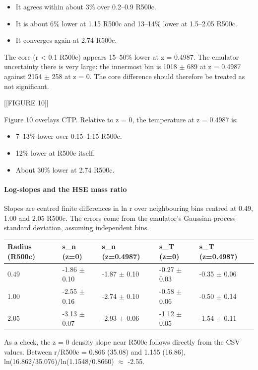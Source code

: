 \documentclass[11pt,a4paper]{article}
\begin{document}
\begin{itemize}
  \item It agrees within about 3\% over 0.2--0.9 R500c.
  \item It is about 6\% lower at 1.15 R500c and 13--14\% lower at 1.5--2.05 R500c.
  \item It converges again at 2.74 R500c.
\end{itemize}
The core (r \textless{} 0.1 R500c) appears 15--50\% lower at z = 0.4987. The emulator uncertainty there is very large: the innermost bin is 1018 $\pm$ 689 at z = 0.4987 against 2154 $\pm$ 258 at z = 0. The core difference should therefore be treated as not significant.

[[FIGURE 10]]

Figure 10 overlays CTP. Relative to z = 0, the temperature at z = 0.4987 is:

\begin{itemize}
  \item 7--13\% lower over 0.15--1.15 R500c.
  \item 12\% lower at R500c itself.
  \item About 30\% lower at 2.74 R500c.
\end{itemize}
\paragraph{Log-slopes and the HSE mass ratio}
Slopes are centred finite differences in ln r over neighbouring bins centred at 0.49, 1.00 and 2.05 R500c. The errors come from the emulator's Gaussian-process standard deviation, assuming independent bins.

\begin{longtable}{@{}p{}p{}p{}p{}p{}@{}}
\toprule
\textbf{Radius (R500c)} & \textbf{s\_n (z=0)} & \textbf{s\_n (z=0.4987)} & \textbf{s\_T (z=0)} & \textbf{s\_T (z=0.4987)} \\ \midrule \endhead
0.49 & -1.86 $\pm$ 0.10 & -1.87 $\pm$ 0.10 & -0.27 $\pm$ 0.03 & -0.35 $\pm$ 0.06 \\
1.00 & -2.55 $\pm$ 0.16 & -2.74 $\pm$ 0.10 & -0.58 $\pm$ 0.06 & -0.50 $\pm$ 0.14 \\
2.05 & -3.13 $\pm$ 0.07 & -2.93 $\pm$ 0.06 & -1.12 $\pm$ 0.05 & -1.54 $\pm$ 0.11 \\
\bottomrule\end{longtable}
As a check, the z = 0 density slope near R500c follows directly from the CSV values. Between r/R500c = 0.866 (35.08) and 1.155 (16.86), ln(16.862/35.076)/ln(1.1548/0.8660) $\approx$ -2.55.
\end{document}

